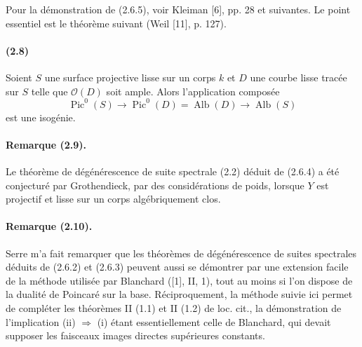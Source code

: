 \documentclass[10pt]{article}
\newcommand{\og}{\guillemotleft}
\newcommand{\fg}{\guillemotright}
\providecommand{\Alb}{\operatorname{Alb}}
\providecommand{\Pic}{\operatorname{Pic}}
\providecommand{\og}{\guillemotleft}
\providecommand{\fg}{\guillemotright}
\begin{document}
Pour la démonstration de (2.6.5), voir Kleiman [6], pp. 28 et suivantes. Le point essentiel est le théorème suivant (Weil [11], p. 127).

\paragraph{(2.8)} Soient $S$ une surface projective lisse sur un corps $k$ et $D$ une courbe lisse tracée sur $S$ telle que $\mathcal O(D)$ soit ample. Alors l'application composée
\[
\Pic^0(S)\longrightarrow\Pic^0(D)=\Alb(D)\longrightarrow\Alb(S)
\]
est une isogénie.

\paragraph{Remarque (2.9).} Le théorème de dégénérescence de suite spectrale (2.2) déduit de (2.6.4) a été conjecturé par Grothendieck, par des considérations de \og poids\fg, lorsque $Y$ est projectif et lisse sur un corps algébriquement clos.

\paragraph{Remarque (2.10).} Serre m'a fait remarquer que les théorèmes de dégénérescence de suites spectrales déduits de (2.6.2) et (2.6.3) peuvent aussi se démontrer par une extension facile de la méthode utilisée par Blanchard ([1], II, 1), tout au moins si l'on dispose de la dualité de Poincaré sur la base. Réciproquement, la méthode suivie ici permet de compléter les théorèmes II (1.1) et II (1.2) de loc. cit., la démonstration de l'implication (ii) $\Rightarrow$ (i) étant essentiellement celle de Blanchard, qui devait supposer les faisceaux images directes supérieures constants.
\end{document}
